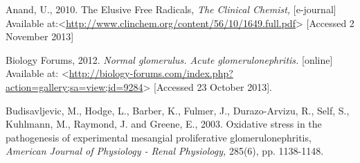 \documentclass[12pt]{report}
\begin{document}
Anand, U., 2010. The Elusive Free Radicals, \textit{The Clinical Chemist,} [e-journal] Available at:<\url{http://www.clinchem.org/content/56/10/1649.full.pdf}> [Accessed 2 November 2013]
\newline
\newline

Biology Forums, 2012. \textit{Normal glomerulus. Acute glomerulonephritis.} [online] Available at: <\url{http://biology-forums.com/index.php?action=gallery;sa=view;id=9284}> [Accessed 23 October 2013].
\newline
\newline

Budisavljevic, M., Hodge, L., Barber, K., Fulmer, J., Durazo-Arvizu, R., Self, S., Kuhlmann, M., Raymond, J. and Greene, E., 2003. Oxidative stress in the pathogenesis of experimental mesangial proliferative glomerulonephritis, \textit{American Journal of Physiology - Renal Physiology,} 285(6), pp. 1138-1148.
\newline
\newline
\end{document}

